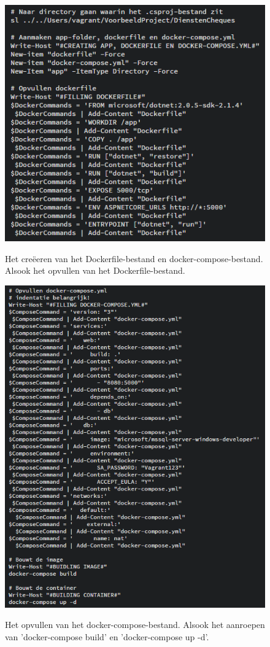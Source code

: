 \begin{figure}
	\centering
	\caption{Het creëeren van het Dockerfile-bestand en docker-compose-bestand. Alsook het opvullen van het Dockerfile-bestand.}
	\includegraphics[scale=0.6]{img/dockerfile01}
	\label{dockerfile01}
\end{figure}

\begin{figure}
	\centering
	\caption{Het opvullen van het docker-compose-bestand. Alsook het aanroepen van 'docker-compose build' en 'docker-compose up -d'.}
	\includegraphics[scale=0.6]{img/dockerfile02}
	\label{dockerfile02}
\end{figure}

